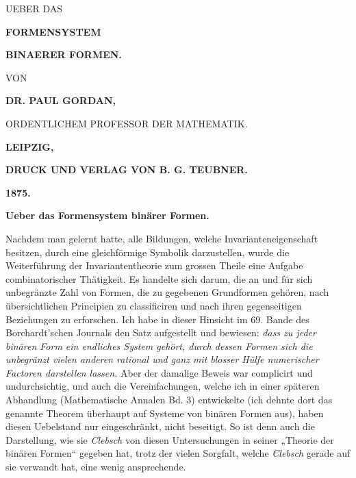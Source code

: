 \documentclass[10pt]{article}
\newcommand{\publishermark}{\begingroup\Large\bfseries\shortstack{B\\[-0.52em]G}\endgroup}
\begin{document}
\small


\begin{center}
{\large UEBER DAS}\par\vspace{1.2em}
{\LARGE\bfseries FORMENSYSTEM}\par\vspace{1.4em}
{\Large\bfseries BINAERER FORMEN.}\par\vspace{3em}
{\small VON}\par\vspace{2.5em}
{\large\bfseries DR. PAUL GORDAN,}\par
{\scriptsize ORDENTLICHEM PROFESSOR DER MATHEMATIK.}\par\vspace{3.2em}
\publishermark\par\vfill
{\large\bfseries LEIPZIG,}\par
{\bfseries DRUCK UND VERLAG VON B. G. TEUBNER.}\par
{\large\bfseries 1875.}
\end{center}

\clearpage

\begin{center}
{\bfseries Ueber das Formensystem binärer Formen.}
\end{center}

Nachdem man gelernt hatte, alle Bildungen, welche Invarianteneigenschaft besitzen, durch eine gleichförmige Symbolik darzustellen, wurde die Weiterführung der Invariantentheorie zum grossen Theile eine Aufgabe combinatorischer Thätigkeit. Es handelte sich darum, die an und für sich unbegränzte Zahl von Formen, die zu gegebenen Grundformen gehören, nach übersichtlichen Principien zu classificiren und nach ihren gegenseitigen Beziehungen zu erforschen. Ich habe in dieser Hinsicht im 69. Bande des Borchardt'schen Journals den Satz aufgestellt und bewiesen: \emph{dass zu jeder binären Form ein endliches System gehört, durch dessen Formen sich die unbegränzt vielen anderen rational und ganz mit blosser Hülfe numerischer Factoren darstellen lassen.} Aber der damalige Beweis war complicirt und undurchsichtig, und auch die Vereinfachungen, welche ich in einer späteren Abhandlung (Mathematische Annalen Bd. 3) entwickelte (ich dehnte dort das genannte Theorem überhaupt auf Systeme von binären Formen aus), haben diesen Uebelstand nur eingeschränkt, nicht beseitigt. So ist denn auch die Darstellung, wie sie \emph{Clebsch} von diesen Untersuchungen in seiner „Theorie der binären Formen`` gegeben hat, trotz der vielen Sorgfalt, welche \emph{Clebsch} gerade auf sie verwandt hat, eine wenig ansprechende.
\end{document}
